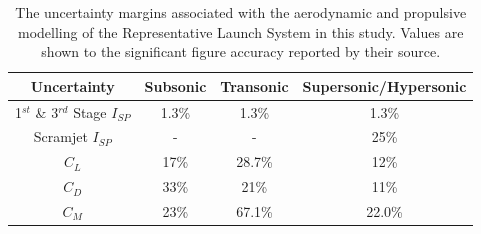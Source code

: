 
\begin{table}[ht]
	\centering
	\begin{tabular}{|c|c|c|c|}
		\hline  Uncertainty & Subsonic & Transonic  & Supersonic/Hypersonic \\ 
		\hline  1$^{st}$ \& 3$^{rd}$ Stage $I_{SP}$ & 1.3\% & 1.3\% &  1.3\% \\ 
		\hline  Scramjet $I_{SP}$ & - & - &  25\% \\ 
		\hline   $C_L$ & 17\% & 28.7\% & 12\% \\  
		\hline   $C_D$ & 33\% & 21\% & 11\% \\  
		\hline   $C_M$  & 23\% & 67.1\% &  22.0\% \\ 
		\hline 
	\end{tabular}
	\caption{The uncertainty margins associated with the aerodynamic and propulsive modelling of the Representative Launch System in this study. Values are shown to the significant figure accuracy reported by their source.}
	\label{tab:AppendixUncertainty}
\end{table}



